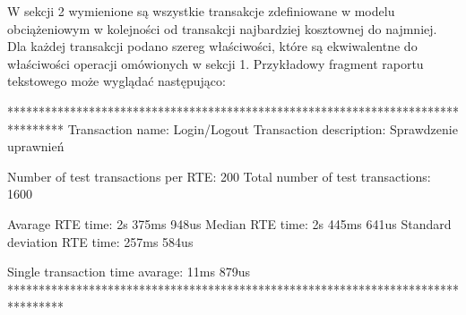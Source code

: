 


W sekcji 2 wymienione są wszystkie transakcje zdefiniowane w modelu obciążeniowym
w kolejności od transakcji najbardziej kosztownej do najmniej. Dla każdej transakcji 
podano szereg właściwości, które są ekwiwalentne do właściwości operacji omówionych w sekcji 1.
Przykładowy fragment raportu tekstowego może wyglądać następująco:

\begin{codeblock}
*********************************************************************************
Transaction name:        Login/Logout
Transaction description: Sprawdzenie uprawnień

Number of test transactions per RTE:  200
Total number of test transactions:    1600

Avarage RTE time:                 2s 375ms 948us
Median RTE time:                  2s 445ms 641us
Standard deviation RTE time:      257ms 584us

Single transaction time avarage:  11ms 879us
*********************************************************************************
\end{codeblock}

